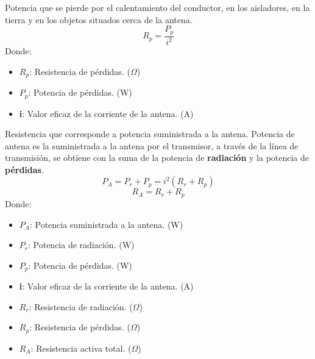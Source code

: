 \documentclass[
	12pt, %
	fleqn, %
	a4paper, %
	oneside, %
]{LegrandOrangeBook}
\begin{document}
\begin{definition}
Potencia que se pierde por el calentamiento del conductor, en los aisladores, en la tierra y en los objetos situados cerca de la antena.
\begin{equation*}
R_p=\frac{P_p}{i^2}
\label{eq:resistencia perdidas}
\end{equation*}
Donde:
\begin{itemize}
\item $R_p$: Resistencia de pérdidas. ($\Omega$)
\item $P_p$: Potencia de pérdidas. (W)
\item \textbf{i}: Valor eficaz de la corriente de la antena. (A)
\end{itemize}
\end{definition}
\begin{definition}
Resistencia que corresponde a potencia suministrada a la antena. Potencia de antena es la suministrada a la antena por el transmisor, a través de la línea de transmisión, se obtiene con la suma de la potencia de \textbf{radiación} y la potencia de \textbf{pérdidas}.
\begin{equation}
P_A=P_r+P_p=i^2\left(R_r+R_p\right)
\label{eq:potencia antena}
\end{equation}
\begin{equation}
R_A=R_r+R_p
\end{equation}
Donde:
\begin{itemize}
\item $P_A$: Potencia suministrada a la antena. (W)
\item $P_r$: Potencia de radiación. (W)
\item $P_p$: Potencia de pérdidas. (W)
\item \textbf{i}: Valor eficaz de la corriente de la antena. (A)
\item $R_r$: Resistencia de radiación. ($\Omega$)
\item $R_p$: Resistencia de pérdidas. ($\Omega$)
\item $R_A$: Resistencia activa total. ($\Omega$)
\end{itemize}
\end{definition}
\end{document}
